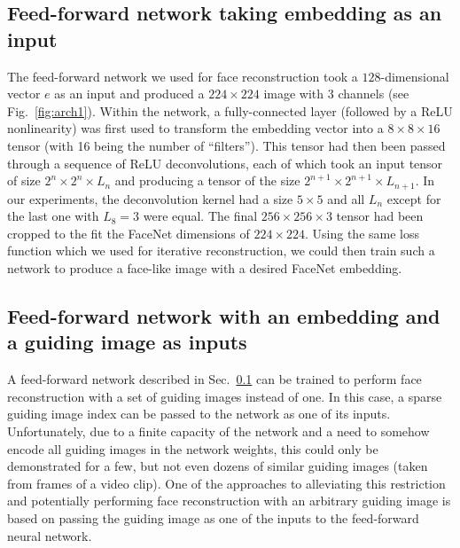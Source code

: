 \documentclass{article}
\def\Emb{e}
\newcommand{\Fig}[1]{Fig.~\ref{#1}}
\newcommand{\Sec}[1]{Sec.~\ref{#1}}
\begin{document}
\subsection{Feed-forward network taking embedding as an input}
\label{sec:simple-ff}

  The feed-forward network we used for face reconstruction took a $128$-dimensional vector $\Emb$ as an input and produced a $224 \times 224$ image with 3 channels (see \Fig{fig:arch1}).
  Within the network, a fully-connected layer (followed by a ReLU nonlinearity) was first used to transform the embedding vector into a $8\times 8 \times 16$ tensor (with 16 being the number of ``filters'').
  This tensor had then been passed through a sequence of ReLU deconvolutions, each of which took an input tensor of size $2^n \times 2^n \times L_n$ and producing a tensor of the size $2^{n+1} \times 2^{n+1} \times L_{n+1}$.
  In our experiments, the deconvolution kernel had a size $5\times 5$ and all $L_n$ except for the last one with $L_8=3$ were equal.
  The final $256\times 256\times 3$ tensor had been cropped to the fit the FaceNet dimensions of $224\times 224$.
  Using the same loss function which we used for iterative reconstruction, we could then train such a network to produce a face-like image with a desired FaceNet embedding.

\subsection{Feed-forward network with an embedding and a guiding image as inputs}
\label{sec:image-ff}

  A feed-forward network described in \Sec{sec:simple-ff} can be trained to perform face reconstruction with a set of guiding images instead of one.
  In this case, a sparse guiding image index can be passed to the network as one of its inputs.
  Unfortunately, due to a finite capacity of the network and a need to somehow encode all guiding images in the network weights, this could only be demonstrated for a few, but not even dozens of similar guiding images (taken from frames of a video clip).
  One of the approaches to alleviating this restriction and potentially performing face reconstruction with an arbitrary guiding image is based on passing the guiding image as one of the inputs to the feed-forward neural network.
\end{document}
